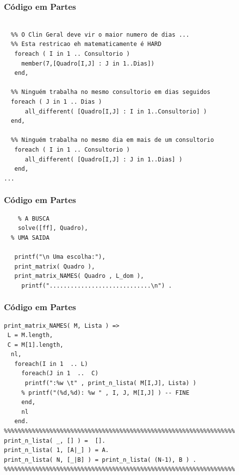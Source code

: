 \documentclass{beamer}
\begin{document}
\begin{frame}[fragile] 

\frametitle{Código em Partes}

\begin{footnotesize}
\begin{verbatim}

  %% O Clin Geral deve vir o maior numero de dias ... 
  %% Esta restricao eh matematicamente é HARD
   foreach ( I in 1 .. Consultorio )
     member(7,[Quadro[I,J] : J in 1..Dias]) 
   end,  
  
  %% Ninguém trabalha no mesmo consultorio em dias seguidos
  foreach ( J in 1 .. Dias )
      all_different( [Quadro[I,J] : I in 1..Consultorio] )
  end,  
 
  %% Ninguém trabalha no mesmo dia em mais de um consultorio
   foreach ( I in 1 .. Consultorio )
      all_different( [Quadro[I,J] : J in 1..Dias] )
   end,  
...  
\end{verbatim}
\end{footnotesize}
    
\end{frame}
\begin{frame}[fragile] 

\frametitle{Código em Partes}

\begin{footnotesize}
\begin{verbatim}
	% A BUSCA
	solve([ff], Quadro),
  % UMA SAIDA
	
   printf("\n Uma escolha:"),
   print_matrix( Quadro ),
   print_matrix_NAMES( Quadro , L_dom ),
	 printf(".............................\n") .
\end{verbatim}
\end{footnotesize}
    
\end{frame}
\begin{frame}[fragile] 

\frametitle{Código em Partes}

\begin{footnotesize}
\begin{verbatim}
print_matrix_NAMES( M, Lista ) =>
 L = M.length,
 C = M[1].length,
  nl,
   foreach(I in 1  .. L)
     foreach(J in 1  ..  C)
      printf(":%w \t" , print_n_lista( M[I,J], Lista) )
     % printf("(%d,%d): %w " , I, J, M[I,J] ) -- FINE
     end,
     nl
   end.
%%%%%%%%%%%%%%%%%%%%%%%%%%%%%%%%%%%%%%%%%%%%%%%%%%%%%%%%%%%%%%%%%%
print_n_lista( _, [] ) =  [].
print_n_lista( 1, [A|_] ) = A.
print_n_lista( N, [_|B] ) = print_n_lista( (N-1), B ) .
%%%%%%%%%%%%%%%%%%%%%%%%%%%%%%%%%%%%%%%%%%%%%%%%%%%%%%%%%%%%%%%%%%
\end{verbatim}
\end{footnotesize}
    
\end{frame}
\end{document}

